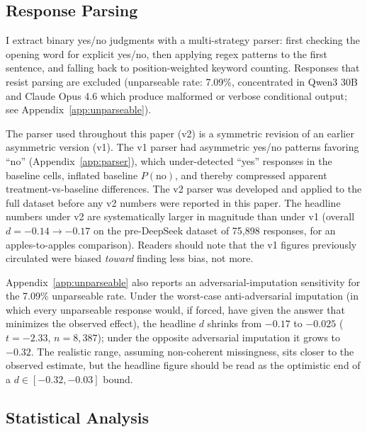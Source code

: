 \documentclass[10pt,twocolumn]{article}
\begin{document}
\subsection{Response Parsing}

I extract binary yes/no judgments with a multi-strategy parser: first checking the opening word for explicit yes/no, then applying regex patterns to the first sentence, and falling back to position-weighted keyword counting. Responses that resist parsing are excluded (unparseable rate: 7.09\%, concentrated in Qwen3 30B and Claude Opus 4.6 which produce malformed or verbose conditional output; see Appendix~\ref{app:unparseable}).

The parser used throughout this paper (v2) is a symmetric revision of an earlier asymmetric version (v1). The v1 parser had asymmetric yes/no patterns favoring ``no'' (Appendix~\ref{app:parser}), which under-detected ``yes'' responses in the baseline cells, inflated baseline $P(\text{no})$, and thereby compressed apparent treatment-vs-baseline differences. The v2 parser was developed and applied to the full dataset before any v2 numbers were reported in this paper. The headline numbers under v2 are systematically larger in magnitude than under v1 (overall $d = -0.14 \to -0.17$ on the pre-DeepSeek dataset of 75,898 responses, for an apples-to-apples comparison). Readers should note that the v1 figures previously circulated were biased \textit{toward} finding less bias, not more.

Appendix~\ref{app:unparseable} also reports an adversarial-imputation sensitivity for the 7.09\% unparseable rate. Under the worst-case anti-adversarial imputation (in which every unparseable response would, if forced, have given the answer that minimizes the observed effect), the headline $d$ shrinks from $-0.17$ to $-0.025$ ($t = -2.33$, $n = 8{,}387$); under the opposite adversarial imputation it grows to $-0.32$. The realistic range, assuming non-coherent missingness, sits closer to the observed estimate, but the headline figure should be read as the optimistic end of a $d \in [-0.32, -0.03]$ bound.

\subsection{Statistical Analysis}
\end{document}

